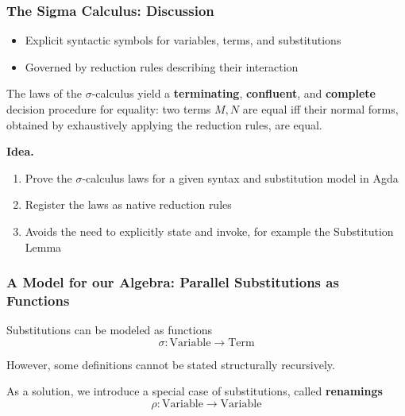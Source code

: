 \documentclass[dvipsnames,aspectratio=169,pdftex]{beamer}
\begin{document}
\begin{frame}[fragile]
  \frametitle{The Sigma Calculus: Discussion}
  \begin{itemize}
    \item Explicit syntactic symbols for variables, terms, and substitutions
    \item Governed by reduction rules describing their interaction
  \end{itemize}

  \begin{theorem}
    The laws of the $\sigma$-calculus yield a \textbf{terminating},
    \textbf{confluent}, and \textbf{complete} decision procedure for equality:
    two terms $M, N$ are equal iff their normal forms, obtained by exhaustively
    applying the reduction rules, are equal.
  \end{theorem}

  \vspace{1em}
  \textbf{Idea.}
  \begin{enumerate}
    \item Prove the $\sigma$-calculus laws for a given syntax and substitution model in
          Agda
    \item Register the laws as native reduction rules
    \item Avoids the need to explicitly state and invoke, for example the Substitution
          Lemma
  \end{enumerate}
\end{frame}

\begin{frame}[fragile]
  \frametitle{A Model for our Algebra: Parallel Substitutions as Functions}
  Substitutions can be modeled as functions
  \[
    \sigma : \text{Variable} \to \text{Term}
  \]

  \noindent\begin{minipage}[t]{0.48\linewidth}
    \raggedright{}
    \EYSLookUp{}
  \end{minipage}
  \hfill
  \begin{minipage}[t]{0.48\linewidth}
    \raggedright{}
    \EYSId{}
  \end{minipage}

  However, some definitions cannot be stated structurally recursively.

  As a solution, we introduce a special case of substitutions, called
  \textbf{renamings}
  \[
    \rho : \text{Variable} \to \text{Variable}
  \]

  \noindent\begin{minipage}[t]{0.48\linewidth}
    \raggedright{}
    \EYRLookUp{}
  \end{minipage}
  \hfill
  \begin{minipage}[t]{0.48\linewidth}
    \raggedright{}
    \EYRId{}
  \end{minipage}
\end{frame}
\end{document}
